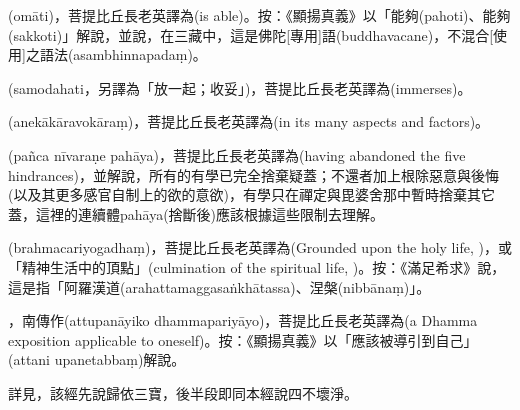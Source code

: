 \startitemgroup[noteitems]
\item{}(omāti)，菩提比丘長老英譯為(is able)。按：《顯揚真義》以「能夠(pahoti)、能夠(sakkoti)」解說，並說，在三藏中，這是佛陀[專用]語(buddhavacane)，不混合[使用]之語法(asambhinnapadaṃ)。
\stopitemgroup

\startitemgroup[noteitems]
\item{}(samodahati，另譯為「放一起；收妥」)，菩提比丘長老英譯為(immerses)。
\stopitemgroup

\startitemgroup[noteitems]
\item{}(anekākāravokāraṃ)，菩提比丘長老英譯為(in its many aspects and factors)。
\stopitemgroup

\startitemgroup[noteitems]
\item{}(pañca nīvaraṇe pahāya)，菩提比丘長老英譯為(having abandoned the five hindrances)，並解說，所有的有學已完全捨棄疑蓋；不還者加上根除惡意與後悔(以及其更多感官自制上的欲的意欲)，有學只在禪定與毘婆舍那中暫時捨棄其它蓋，這裡的連續體pahāya(捨斷後)應該根據這些限制去理解。
\stopitemgroup

\startitemgroup[noteitems]
\item{}(brahmacariyogadhaṃ)，菩提比丘長老英譯為(Grounded upon the holy life, )，或「精神生活中的頂點」(culmination of the spiritual life, )。按：《滿足希求》說，這是指「阿羅漢道(arahattamaggasaṅkhātassa)、涅槃(nibbānaṃ)」。
\stopitemgroup

\startitemgroup[noteitems]
\item{}，南傳作(attupanāyiko dhammapariyāyo)，菩提比丘長老英譯為(a Dhamma exposition applicable to oneself)。按：《顯揚真義》以「應該被導引到自己」(attani upanetabbaṃ)解說。
\stopitemgroup

\startitemgroup[noteitems]
\item{}詳見，該經先說歸依三寶，後半段即同本經說四不壞淨。
\stopitemgroup


